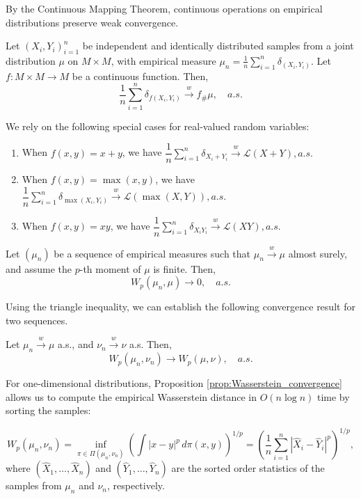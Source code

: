 By the Continuous Mapping Theorem, continuous operations on empirical distributions preserve weak convergence.

\begin{proposition}
  Let $(X_i, Y_i)_{i=1}^n$ be independent and identically distributed samples from a joint distribution $\mu$ on $M \times M$, with empirical measure $\mu_n = \frac{1}{n} \sum_{i=1}^n \delta_{(X_i, Y_i)}$. Let $f: M \times M \to M$ be a continuous function. Then,
  $$\frac{1}{n}\sum_{i=1}^n \delta_{f(X_i, Y_i)} \stackrel{w}{\longrightarrow} f_{\#}\mu, \quad a.s.$$
\end{proposition}

We rely on the following special cases for real-valued random variables:

\begin{enumerate}
  \item When $f(x,y) = x + y$, we have
        $\dfrac{1}{n}\sum\limits_{i=1}^n \delta_{X_i + Y_i} \stackrel{w}{\longrightarrow} \mathcal{L}(X+Y), a.s.$

  \item When $f(x,y) = \max(x,y)$, we have
        $\dfrac{1}{n}\sum\limits_{i=1}^n \delta_{\max(X_i, Y_i)} \stackrel{w}{\longrightarrow} \mathcal{L}(\max(X,Y)), a.s.$

  \item When $f(x,y) = xy$, we have
        $\dfrac{1}{n}\sum\limits_{i=1}^n \delta_{X_i Y_i} \stackrel{w}{\longrightarrow} \mathcal{L}(XY), a.s.$

\end{enumerate}

\begin{proposition}
  Let $(\mu_n)$ be a sequence of empirical measures such that $\mu_n \stackrel{w}{\longrightarrow} \mu$ almost surely, and assume the $p$-th moment of $\mu$ is finite. Then,
  $$W_p(\mu_n, \mu) \to 0, \quad a.s.$$
\end{proposition}

Using the triangle inequality, we can establish the following convergence result for two sequences.

\begin{proposition}
  \label{prop:Wasserstein_convergence}
  Let $\mu_n \stackrel{w}{\longrightarrow} \mu$ a.s., and $\nu_n \stackrel{w}{\longrightarrow} \nu$ a.s. Then,
  $$W_p(\mu_n, \nu_n) \to W_p(\mu, \nu), \quad a.s.$$
\end{proposition}

For one-dimensional distributions, Proposition \ref{prop:Wasserstein_convergence} allows us to compute the empirical Wasserstein distance in $O(n\log n)$ time by sorting the samples:

\begin{equation}
  W_p(\mu_n, \nu_n) = \inf_{\pi \in \Pi(\mu_n, \nu_n)} \left( \int |x-y|^p \, d\pi(x,y) \right)^{1/p} = \left( \frac{1}{n} \sum_{i=1}^n |\hat{X}_{i} - \hat{Y}_{i}|^p \right)^{1/p},
\end{equation}
where $(\hat{X}_1, \ldots, \hat{X}_n)$ and $(\hat{Y}_1, \ldots, \hat{Y}_n)$ are the sorted order statistics of the samples from $\mu_n$ and $\nu_n$, respectively.
